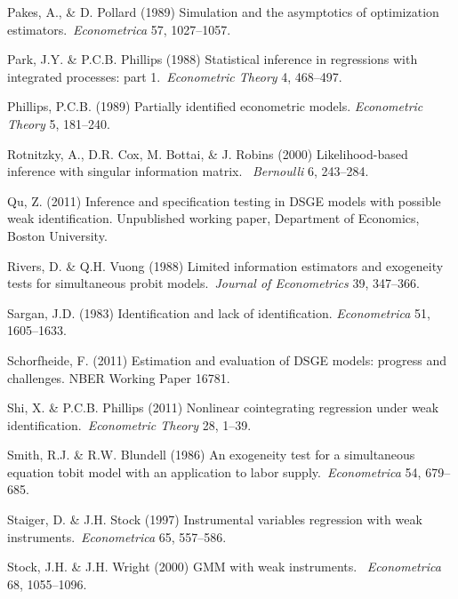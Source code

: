 \documentclass[12pt,thmsb,titlepage,final,oneside,letterpaper]{article}
\begin{document}
\begin{description}
\item Pakes, A., \& D. Pollard (1989) Simulation and the asymptotics of
optimization estimators.\ \emph{Econometrica} 57, 1027--1057.

\item Park, J.Y. \& P.C.B. Phillips (1988) Statistical inference in
regressions with integrated processes: part 1.\ \emph{Econometric Theory }4,
468--497.

\item Phillips, P.C.B. (1989) Partially identified econometric models. \emph{%
Econometric Theory} 5, 181--240.

\item Rotnitzky, A., D.R. Cox, M. Bottai, \& J. Robins (2000)
Likelihood-based inference with singular information matrix.\ \emph{%
Bernoulli }6, 243--284.

\item Qu, Z. (2011) Inference and specification testing in DSGE models with
possible weak identification. Unpublished working paper, Department of
Economics, Boston University.

\item Rivers, D. \& Q.H. Vuong (1988) Limited information estimators and
exogeneity tests for simultaneous probit models.\ \emph{Journal of
Econometrics }39, 347--366.

\item Sargan, J.D. (1983) Identification and lack of identification. \emph{%
Econometrica} 51, 1605--1633.

\item Schorfheide, F. (2011) Estimation and evaluation of DSGE models:
progress and challenges. NBER Working Paper 16781.

\item Shi, X. \& P.C.B. Phillips (2011) Nonlinear cointegrating regression
under weak identification.\ \emph{Econometric Theory} 28, 1--39.

\item Smith, R.J. \& R.W. Blundell (1986) An exogeneity test for a
simultaneous equation tobit model with an application to labor supply.\ 
\emph{Econometrica} 54, 679--685.

\item Staiger, D. \& J.H. Stock (1997) Instrumental variables regression
with weak instruments.\ \emph{Econometrica} 65, 557--586.

\item Stock, J.H. \& J.H. Wright (2000) GMM with weak instruments.\ \emph{%
Econometrica }68, 1055--1096.\newpage 
\end{description}
\end{document}

